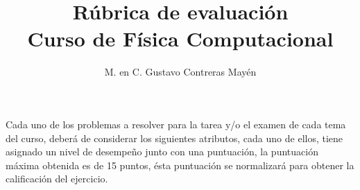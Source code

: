 \documentclass[landscape]{article}
\title{Rúbrica de evaluación \\ Curso de Física Computacional}
\author{M. en C. Gustavo Contreras Mayén}
\date{ }
\begin{document}
\maketitle
\fontsize{14}{14}\selectfont
{}
Cada uno de los problemas a resolver para la tarea y/o el examen de cada tema del curso, deberá de considerar los siguientes atributos, cada uno de ellos, tiene asignado un nivel de desempeño junto con una puntuación, la puntuación máxima obtenida es de 15 puntos, ésta puntuación se normalizará para obtener la calificación del ejercicio.
\end{document}
